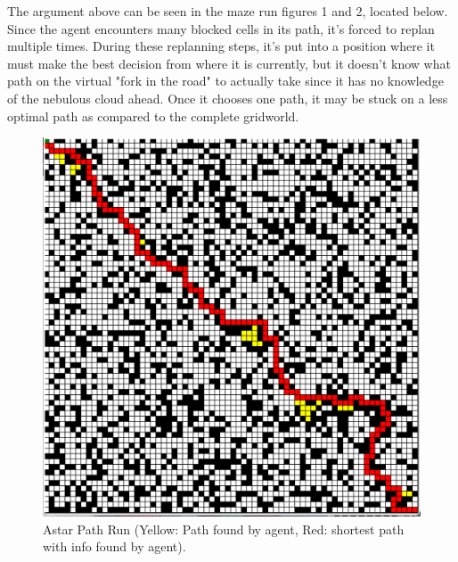 \documentclass{homeworg}
\begin{document}
The argument above can be seen in the maze run figures 1 and 2, located below. Since the agent encounters many blocked cells in its path, it's forced to replan multiple times. During these replanning steps, it's put into a position where it must make the best decision from where it is currently, but it doesn't know what path on the virtual "fork in the road" to actually take since it has no knowledge of the nebulous cloud ahead. Once it chooses one path, it may be stuck on a less optimal path as compared to the complete gridworld.

\newpage
\begin{figure}[h]
  	\centering
  	\includegraphics*[scale=0.3]{Astar1.jpeg}
	\caption{Astar Path Run (Yellow: Path found by agent, Red: shortest path with info found by agent).}
	\label{fig:example}
\end{figure}
 
\end{document}
